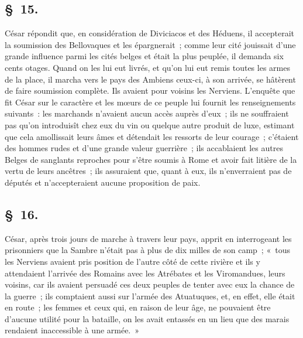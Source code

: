 \documentclass[french,twoside]{book} %
\begin{document}
\subsection[{§ 15.}]{ \textsc{§ 15.} }
\noindent César répondit que, en considération de Diviciacos et des Héduens, il accepterait la soumission des Bellovaques et les épargnerait ; comme leur cité jouissait d’une grande influence parmi les cités belges et était la plus peuplée, il demanda six cents otages. Quand on les lui eut livrés, et qu’on lui eut remis toutes les armes de la place, il marcha vers le pays des Ambiens ceux-ci, à son arrivée, se hâtèrent de faire soumission complète. Ils avaient pour voisins les Nerviens. L'enquête que fit César sur le caractère et les mœurs de ce peuple lui fournit les renseignements suivants : les marchands n’avaient aucun accès auprès d’eux ; ils ne souffraient pas qu’on introduisît chez eux du vin ou quelque autre produit de luxe, estimant que cela amollissait leurs âmes et détendait les ressorts de leur courage ; c’étaient des hommes rudes et d’une grande valeur guerrière ; ils accablaient les autres Belges de sanglants reproches pour s’être soumis à Rome et avoir fait litière de la vertu de leurs ancêtres ; ils assuraient que, quant à eux, ils n’enverraient pas de députés et n’accepteraient aucune proposition de paix.
\subsection[{§ 16.}]{ \textsc{§ 16.} }
\noindent César, après trois jours de marche à travers leur pays, apprit en interrogeant les prisonniers que la Sambre n’était pas à plus de dix milles de son camp ; « tous les Nerviens avaient pris position de l’autre côté de cette rivière et ils y attendaient l’arrivée des Romains avec les Atrébates et les Viromandues, leurs voisins, car ils avaient persuadé ces deux peuples de tenter avec eux la chance de la guerre ; ils comptaient aussi sur l’armée des Atuatuques, et, en effet, elle était en route ; les femmes et ceux qui, en raison de leur âge, ne pouvaient être d’aucune utilité pour la bataille, on les avait entassés en un lieu que des marais rendaient inaccessible à une armée. »
\end{document}
